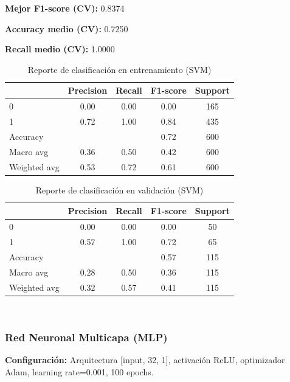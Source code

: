 \documentclass[conference]{IEEEtran}
\begin{document}

\textbf{Mejor F1-score (CV):} 0.8374 

\textbf{Accuracy medio (CV):} 0.7250 

\textbf{Recall medio (CV):} 1.0000



\begin{table}[htbp]
\centering
\caption{Reporte de clasificación en entrenamiento (SVM)}
\begin{tabular}{lcccc}
\toprule
 & Precision & Recall & F1-score & Support \\
\midrule
0 & 0.00 & 0.00 & 0.00 & 165 \\
1 & 0.72 & 1.00 & 0.84 & 435 \\
\midrule
Accuracy & & & 0.72 & 600 \\
Macro avg & 0.36 & 0.50 & 0.42 & 600 \\
Weighted avg & 0.53 & 0.72 & 0.61 & 600 \\
\bottomrule
\end{tabular}
\label{tab:svm_train}
\end{table}

\begin{table}[htbp]
\centering
\caption{Reporte de clasificación en validación (SVM)}
\begin{tabular}{lcccc}
\toprule
 & Precision & Recall & F1-score & Support \\
\midrule
0 & 0.00 & 0.00 & 0.00 & 50 \\
1 & 0.57 & 1.00 & 0.72 & 65 \\
\midrule
Accuracy & & & 0.57 & 115 \\
Macro avg & 0.28 & 0.50 & 0.36 & 115 \\
Weighted avg & 0.32 & 0.57 & 0.41 & 115 \\
\bottomrule
\end{tabular}
\label{tab:svm_val}
\end{table}


\\
\vspace{2em}    %

\subsubsection{Red Neuronal Multicapa (MLP)}

\textbf{Configuración:} Arquitectura [input, 32, 1], activación ReLU, optimizador Adam, learning rate=0.001, 100 epochs.
\end{document}
